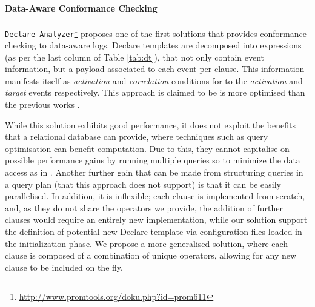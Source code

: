 \paragraph*{Data-Aware Conformance Checking}
\texttt{Declare Analyzer}\footnote{\url{http://www.promtools.org/doku.php?id=prom611}} \cite{BurattinMS16} proposes one of the first solutions that provides conformance checking to data-aware logs. Declare templates are decomposed into \LTLf expressions (as per the last column of Table \ref{tab:dt}), that not only contain event information, but a payload associated to each event per clause. This information manifests itself as \emph{activation} and \emph{correlation} conditions for to the \emph{activation} and \emph{target} events respectively. This approach is claimed to be is more optimised than the previous works \cite{VanDerAalst2005}.%

While this solution exhibits good performance, it does not exploit the benefits that a relational database can provide, where techniques such as query optimisation can benefit computation. Due to this, they cannot capitalise on possible performance gains by running multiple queries so to minimize the data access as in \cite{BellatrecheKB21}. Another further gain that can be made from structuring queries in a query plan (that this approach does not support) is that it can be easily parallelised. In addition, it is inflexible; each clause is implemented from scratch, and, as they do not share the operators we provide, the addition of further clauses would require an entirely new implementation, while our solution support the definition of potential new Declare template via configuration files loaded in the initialization phase. We propose a more generalised solution, where each clause is composed of a combination of unique operators, allowing for any new clause to be included on the fly.


